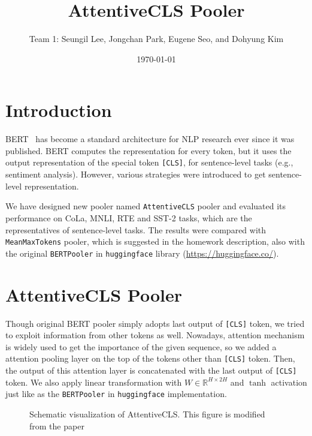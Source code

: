 \documentclass[UTF8]{article}
\title{AttentiveCLS Pooler}
\author{
  Team 1:  %
  Seungil Lee, Jongchan Park, Eugene Seo, and Dohyung Kim %
}
\date{\today}
\begin{document}
\maketitle

\section{Introduction}

BERT~\cite{devlin-etal-2019-bert} has become a standard architecture for NLP research ever since it was published. BERT computes the representation for every token, but it uses the output representation of the special token \texttt{[CLS]}, for sentence-level tasks (e.g., sentiment analysis). However, various strategies were introduced to get sentence-level representation.

We have designed new pooler named \texttt{AttentiveCLS} pooler and evaluated its performance on CoLa, MNLI, RTE and SST-2 tasks, which are the representatives of sentence-level tasks. The results were compared with \texttt{MeanMaxTokens} pooler, which is suggested in the homework description, also with the original \texttt{BERTPooler} in \texttt{huggingface} library (\url{https://huggingface.co/}).

\section{AttentiveCLS Pooler}
Though original BERT pooler simply adopts last output of \texttt{[CLS]} token, we tried to exploit information from other tokens as well. Nowadays, attention mechanism is widely used to get the importance of the given sequence, so we added a attention pooling layer on the top of the tokens other than \texttt{[CLS]} token. Then, the output of this attention layer is concatenated with the last output of \texttt{[CLS]} token. We also apply linear transformation with $W \in \mathbb{R}^{H \times 2H}$ and $\tanh$ activation just like as the \texttt{BERTPooler} in \texttt{huggingface} implementation.

\begin{figure}[htp] 
  \caption{Schematic visualization of AttentiveCLS. This figure is modified from the paper~\cite{lehevcka2020adjusting}}
  \end{figure} 
\end{document}
